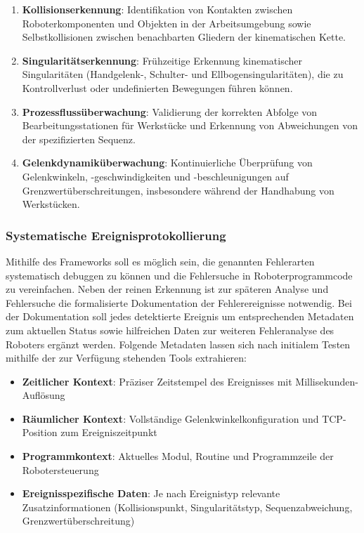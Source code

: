 \begin{enumerate}
  \item \textbf{Kollisionserkennung}: Identifikation von Kontakten
    zwischen Roboterkomponenten und Objekten in der Arbeitsumgebung
    sowie Selbstkollisionen zwischen benachbarten Gliedern der
    kinematischen Kette.

  \item \textbf{Singularitätserkennung}: Frühzeitige Erkennung
    kinematischer Singularitäten (Handgelenk-, Schulter- und
    Ellbogensingularitäten), die zu Kontrollverlust oder
    undefinierten Bewegungen führen können.

  \item \textbf{Prozessflussüberwachung}: Validierung der korrekten
    Abfolge von Bearbeitungsstationen für Werkstücke und Erkennung
    von Abweichungen von der spezifizierten Sequenz.

  \item \textbf{Gelenkdynamiküberwachung}: Kontinuierliche
    Überprüfung von Gelenkwinkeln, -geschwindigkeiten und
    -beschleunigungen auf Grenzwertüberschreitungen, insbesondere
    während der Handhabung von Werkstücken.
\end{enumerate}

\subsubsection{Systematische Ereignisprotokollierung}

Mithilfe des Frameworks soll es möglich sein, die genannten Fehlerarten
systematisch debuggen zu können und die Fehlersuche in Roboterprogrammcode zu
vereinfachen. Neben der reinen Erkennung ist zur späteren Analyse und
Fehlersuche die formalisierte
Dokumentation der Fehlerereignisse notwendig. Bei der Dokumentation
soll jedes detektierte Ereignis um
entsprechenden Metadaten zum aktuellen Status sowie hilfreichen Daten zur
weiteren Fehleranalyse des Roboters ergänzt werden.
Folgende Metadaten lassen sich nach initialem Testen mithilfe der zur Verfügung
stehenden Tools extrahieren:

\begin{itemize}
  \item \textbf{Zeitlicher Kontext}: Präziser Zeitstempel des
    Ereignisses mit Millisekunden-Auflösung
  \item \textbf{Räumlicher Kontext}: Vollständige
    Gelenkwinkelkonfiguration und TCP-Position zum Ereigniszeitpunkt
  \item \textbf{Programmkontext}: Aktuelles Modul, Routine und
    Programmzeile der Robotersteuerung
  \item \textbf{Ereignisspezifische Daten}: Je nach Ereignistyp
    relevante Zusatzinformationen (Kollisionspunkt, Singularitätstyp,
    Sequenzabweichung, Grenzwertüberschreitung)
\end{itemize}

